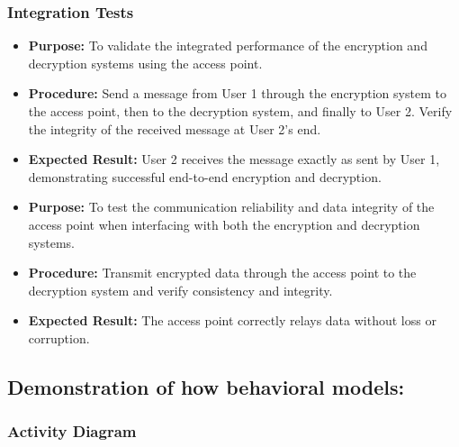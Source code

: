 \documentclass[12pt]{article}
\begin{document}
\subsubsection*{Integration Tests}

	\begin{itemize}
		\item \textbf{Purpose:} To validate the integrated performance of the encryption and decryption systems using the access point.
		\item \textbf{Procedure:} Send a message from User 1 through the encryption system to the access point, then to the decryption system, and finally to User 2. Verify the integrity of the received message at User 2's end.
		\item \textbf{Expected Result:} User 2 receives the message exactly as sent by User 1, demonstrating successful end-to-end encryption and decryption.
	\end{itemize}
	
	\begin{itemize}
		\item \textbf{Purpose:} To test the communication reliability and data integrity of the access point when interfacing with both the encryption and decryption systems.
		\item \textbf{Procedure:} Transmit encrypted data through the access point to the decryption system and verify consistency and integrity.
		\item \textbf{Expected Result:} The access point correctly relays data without loss or corruption.
	\end{itemize}

\newpage
\subsection{Demonstration of how behavioral models:}
	
	\subsubsection{Activity Diagram}
	
\end{document}

